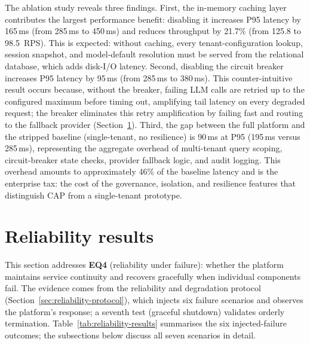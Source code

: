 \documentclass[a4paper,noexaminfo]{sapthesis}
\begin{document}
The ablation study reveals three findings.  First, the in-memory caching
layer contributes the largest performance benefit: disabling it increases
P95 latency by 165\,ms (from 285\,ms to 450\,ms) and reduces throughput
by 21.7\% (from 125.8 to 98.5~RPS).  This is expected: without caching,
every tenant-configuration lookup, session snapshot, and model-default
resolution must be served from the relational database, which adds
disk-I/O latency.  Second, disabling the circuit breaker increases P95
latency by 95\,ms (from 285\,ms to 380\,ms).  This counter-intuitive
result occurs because, without the breaker, failing LLM calls are
retried up to the configured maximum before timing out, amplifying tail
latency on every degraded request; the breaker eliminates this retry
amplification by failing fast and routing to the fallback provider
(Section~\ref{sec:reliability-results}).  Third, the gap between the full
platform and the stripped baseline (single-tenant, no resilience) is
90\,ms at P95 (195\,ms versus 285\,ms), representing the aggregate
overhead of multi-tenant query scoping, circuit-breaker state checks,
provider fallback logic, and audit logging.  This overhead amounts to
approximately 46\% of the baseline latency and is the enterprise tax:
the cost of the governance, isolation, and resilience features that
distinguish CAP from a single-tenant prototype.


\section{Reliability results}
\label{sec:reliability-results}

This section addresses \textbf{EQ4} (reliability under failure): whether
the platform maintains service continuity and recovers gracefully when
individual components fail.  The evidence comes from the reliability and
degradation protocol (Section~\ref{sec:reliability-protocol}), which
injects six failure scenarios and observes the platform's response; a
seventh test (graceful shutdown) validates orderly termination.
Table~\ref{tab:reliability-results} summarises the six injected-failure
outcomes; the subsections below discuss all seven scenarios in detail.
\end{document}
